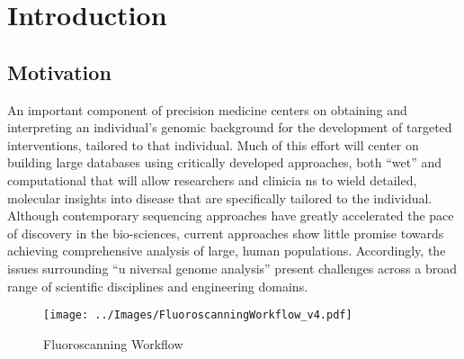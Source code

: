 \section{Introduction}

\subsection{Motivation}
An important component of precision medicine centers on obtaining and interpreting an individual's genomic background for the development of targeted interventions, tailored to that 
individual. Much of this effort will center on building large databases using critically developed approaches, both ``wet'' and computational that will allow researchers and clinicia
ns to wield detailed, molecular insights into disease that are specifically tailored to the individual. Although contemporary sequencing approaches have greatly accelerated the pace 
of discovery in the bio-sciences, current approaches show little promise towards achieving comprehensive analysis of large, human populations. Accordingly, the issues surrounding ``u
niversal genome analysis'' present challenges across a broad range of scientific disciplines and engineering domains.

\begin{figure}[H]
\centering
\texttt{[image: ../Images/FluoroscanningWorkflow\_v4.pdf]}
\caption{Fluoroscanning Workflow}
\label{fig:Workflow}
\end{figure}

